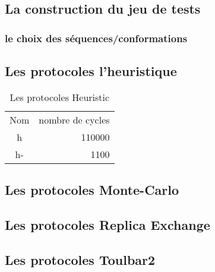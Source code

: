   \subsection{La construction du jeu de tests}
    \subsubsection{le choix des séquences/conformations}
  
   \subsection{Les protocoles l'heuristique} 

    \begin{table}[!htbp]
      \centering

      \begin{tabular}{cr}

        \toprule
        Nom & nombre de cycles \\
        \cmidrule{1-2}
        h   & 110000 \\  
        h-  & 1100   \\  
        \bottomrule

      \end{tabular}      
      \caption{Les protocoles Heuristic}
\label{tab:protoH}      
    \end{table}


   \subsection{Les protocoles Monte-Carlo}
   \subsection{Les protocoles Replica Exchange}
   \subsection{Les protocoles Toulbar2} 

